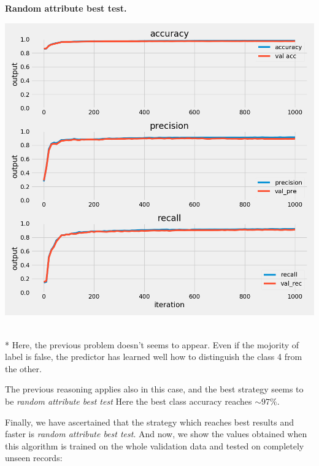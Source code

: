 \documentclass{article}
\begin{document}
\begin{multicols}{2}
	\begin{minipage}[t]{1\columnwidth}
	\begin{center}
	\textbf{Random attribute best test.}\par\medskip
	\includegraphics[width=0.9\columnwidth]{../images/random_selctor_best_test_class_4_cross_val_4.png}
	\label{best}
	\end{center}
	\end{minipage}
	\text{ }
	\\*
	Here, the previous problem doesn't seems to appear. 
	Even if the mojority of label is false, the predictor has learned well how to distinguish the class 4 from the other.
	
	The previous reasoning applies also in this case, and the best strategy seems to be \textit{random attribute best test}
	Here the best class accuracy reaches $\sim 97\%$. 
\end{multicols}
\newpage


Finally, we have ascertained that the strategy which reaches best results and faster is \textit{random attribute best test}.
And now, we show the values obtained when this algorithm is trained on the whole validation data and tested on
completely unseen records:
\end{document}
